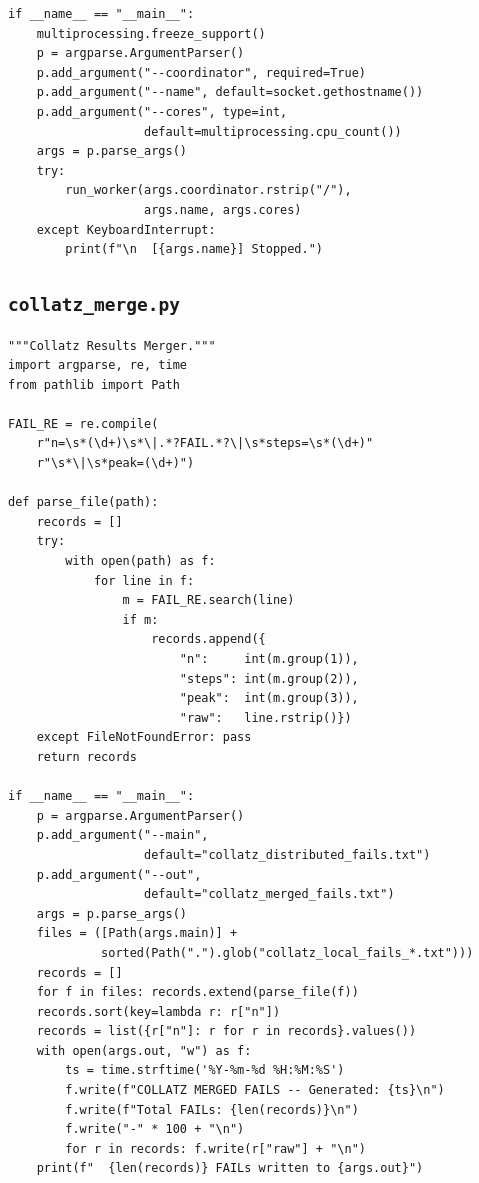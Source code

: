 \documentclass{mcom-l}
\theoremstyle{definition}
\theoremstyle{remark}
\numberwithin{equation}{section}
\begin{document}
\begin{lstlisting}[caption={Worker: multiprocessing dispatch and
                             Syracuse kernel.},
                   label={lst:worker}]
if __name__ == "__main__":
    multiprocessing.freeze_support()
    p = argparse.ArgumentParser()
    p.add_argument("--coordinator", required=True)
    p.add_argument("--name", default=socket.gethostname())
    p.add_argument("--cores", type=int,
                   default=multiprocessing.cpu_count())
    args = p.parse_args()
    try:
        run_worker(args.coordinator.rstrip("/"),
                   args.name, args.cores)
    except KeyboardInterrupt:
        print(f"\n  [{args.name}] Stopped.")
\end{lstlisting}

\subsection{\texttt{collatz\_merge.py}}

\begin{lstlisting}[caption={Results merger: combines distributed FAIL
                             files into a single sorted report.},
                   label={lst:merge}]
"""Collatz Results Merger."""
import argparse, re, time
from pathlib import Path

FAIL_RE = re.compile(
    r"n=\s*(\d+)\s*\|.*?FAIL.*?\|\s*steps=\s*(\d+)"
    r"\s*\|\s*peak=(\d+)")

def parse_file(path):
    records = []
    try:
        with open(path) as f:
            for line in f:
                m = FAIL_RE.search(line)
                if m:
                    records.append({
                        "n":     int(m.group(1)),
                        "steps": int(m.group(2)),
                        "peak":  int(m.group(3)),
                        "raw":   line.rstrip()})
    except FileNotFoundError: pass
    return records

if __name__ == "__main__":
    p = argparse.ArgumentParser()
    p.add_argument("--main",
                   default="collatz_distributed_fails.txt")
    p.add_argument("--out",
                   default="collatz_merged_fails.txt")
    args = p.parse_args()
    files = ([Path(args.main)] +
             sorted(Path(".").glob("collatz_local_fails_*.txt")))
    records = []
    for f in files: records.extend(parse_file(f))
    records.sort(key=lambda r: r["n"])
    records = list({r["n"]: r for r in records}.values())
    with open(args.out, "w") as f:
        ts = time.strftime('%Y-%m-%d %H:%M:%S')
        f.write(f"COLLATZ MERGED FAILS -- Generated: {ts}\n")
        f.write(f"Total FAILs: {len(records)}\n")
        f.write("-" * 100 + "\n")
        for r in records: f.write(r["raw"] + "\n")
    print(f"  {len(records)} FAILs written to {args.out}")
\end{lstlisting}
\end{document}
